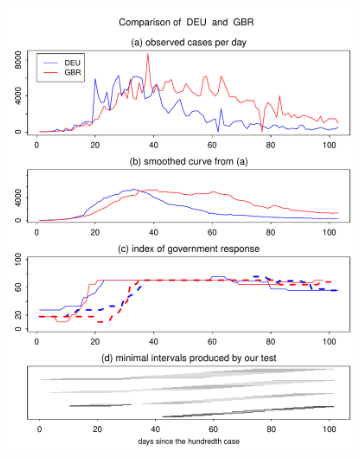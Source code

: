 \documentclass[a4paper,12pt]{article}
\numberwithin{equation}{section}
\begin{document}
\begin{figure}[t!]
\begin{subfigure}[b]{0.475\textwidth}
\includegraphics[width=\textwidth]{plots/DEU_vs_GBR}
\end{subfigure}
\end{figure}
\end{document}
